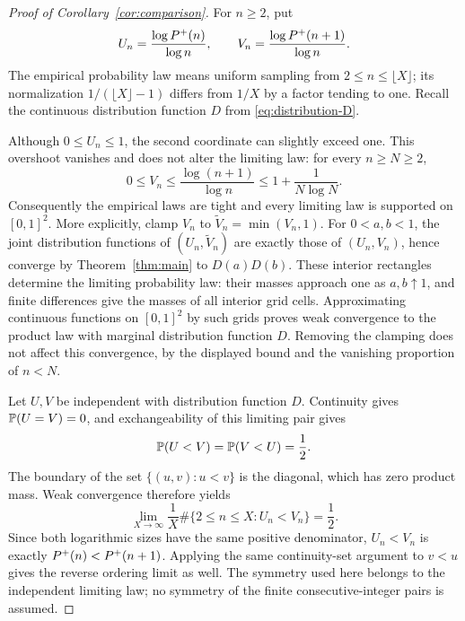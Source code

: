 \begin{proof}[Proof of Corollary~\ref{cor:comparison}]
For $n\ge2$, put
\[
 U_n=\frac{\log P^+(n)}{\log n},\qquad
 V_n=\frac{\log P^+(n+1)}{\log n}.
\]
The empirical probability law means uniform sampling from
$2\le n\le\lfloor X\rfloor$; its normalization
$1/(\lfloor X\rfloor-1)$ differs from $1/X$ by a factor tending
to one.  Recall the continuous distribution function $D$ from
\eqref{eq:distribution-D}.

Although $0\le U_n\le1$, the second coordinate can slightly
exceed one.  This overshoot vanishes and does not alter the limiting
law: for every $n\ge N\ge2$,
\[
 0\le V_n\le\frac{\log(n+1)}{\log n}
       \le1+\frac1{N\log N}.
\]
Consequently the empirical laws are tight and every limiting law is
supported on $[0,1]^2$.  More explicitly, clamp $V_n$ to
$\widetilde V_n=\min(V_n,1)$.  For $0<a,b<1$, the joint
distribution functions of $(U_n,\widetilde V_n)$ are exactly those
of $(U_n,V_n)$, hence converge by Theorem~\ref{thm:main} to
$D(a)D(b)$.  These interior rectangles determine the limiting
probability law: their masses approach one as $a,b\uparrow1$,
and finite differences give the masses of all interior grid cells.
Approximating continuous functions on $[0,1]^2$ by such grids proves
weak convergence to the product law with marginal distribution function
$D$.  Removing the clamping does not affect this convergence, by the
displayed bound and the vanishing proportion of $n<N$.

Let $U,V$ be independent with distribution function $D$.
Continuity gives $\mathbb P(U=V)=0$, and exchangeability of this
limiting pair gives
\[
 \mathbb P(U<V)=\mathbb P(V<U)=\frac12.
\]
The boundary of the set $\{(u,v):u<v\}$ is the diagonal, which
has zero product mass.  Weak convergence therefore yields
\[
 \lim_{X\to\infty}\frac1X
    \#\{2\le n\le X:U_n<V_n\}=\frac12.
\]
Since both logarithmic sizes have the same positive denominator,
$U_n<V_n$ is exactly $P^+(n)<P^+(n+1)$.
Applying the same continuity-set argument to $v<u$ gives the
reverse ordering limit as well.
The symmetry used here belongs to the independent limiting law;
no symmetry of the finite consecutive-integer pairs is assumed.
\end{proof}
